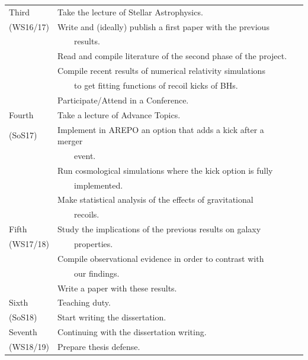 \documentclass[a4,useAMS,usenatbib,usegraphicx,12pt]{article}
\begin{document}
\begin{table}[!htbp]
\begin{flushleft}
\begin{center}
\begin{footnotesize}
\begin{tabular}{l  l  l}
	\hline
	Third
	& \tabitem Take the lecture of Stellar Astrophysics.  			& \\
	(WS16/17)
	& \tabitem Write and (ideally) publish a first paper with the previous	& \\
	& \ \ \ \ results.    							& \\
	& \tabitem Read and compile literature of the second phase of the project.& \\
	& \tabitem Compile recent results of numerical relativity simulations	& \\
	& \ \ \ \ to get fitting functions of recoil kicks of BHs.    		& \\
	& \tabitem Participate/Attend in a Conference.	  			& \\
	\hline
	
	Fourth
	& \tabitem Take a lecture of Advance Topics.	 			& \\
	(SoS17)
	& \tabitem Implement in AREPO an option that adds a kick after a merger	& \\
	& \ \ \ \ event.							& \\
	& \tabitem Run cosmological simulations where the kick option is fully	& \\
	& \ \ \ \ implemented.							& \\
	& \tabitem Make statistical analysis of the effects of gravitational	& \\
	& \ \ \ \ recoils.							& \\
	
	\hline
	Fifth
	& \tabitem Study the implications of the previous results on galaxy	& \\
	(WS17/18)
	& \ \ \ \ properties.							& \\
	& \tabitem Compile observational evidence in order to contrast with	& \\
	& \ \ \ \ our findings.							& \\
	& \tabitem Write a paper with these results.				& \\

	\hline
	Sixth
	& \tabitem Teaching duty.						& \\
	(SoS18)
	& \tabitem Start writing the dissertation.				& \\
	
	\hline
	Seventh
	& \tabitem Continuing with the dissertation writing.			& \\
	(WS18/19)
	& \tabitem Prepare thesis defense.					& \\
	\hline\hline
	
  \end{tabular}  
\end{footnotesize}
\end{center}
\end{flushleft}
\end{table}



\

\end{document}
